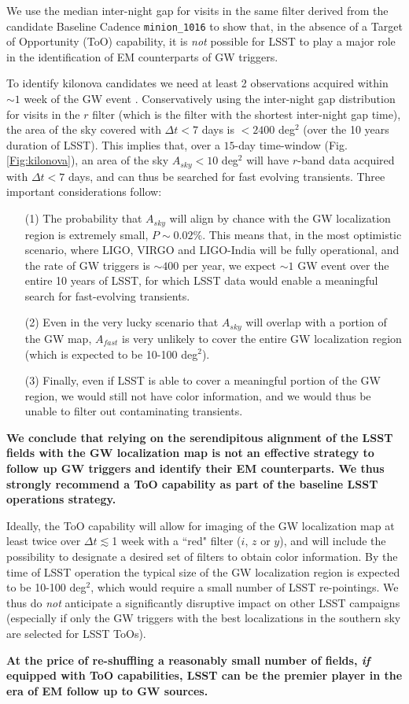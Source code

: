 We use the median inter-night gap  for visits in the same filter derived from the candidate Baseline Cadence \texttt{minion\_1016} to show that, in the absence of a Target of Opportunity (ToO) capability, it is \emph{not} possible for LSST  to play a major role in the identification of EM counterparts of GW triggers.  

To identify kilonova candidates we need at least 2 observations acquired within $\sim 1$ week  of the GW event \citep{Cowperthwaite15}.
Conservatively using the inter-night gap distribution for visits in the $r$ filter (which is the filter with the shortest  inter-night gap time), the area of the sky covered with  $\Delta t<7$ days is $<2400$ deg$^2$ (over the 10 years duration of LSST). This implies that, over a $15$-day time-window (Fig. \ref{Fig:kilonova}), an area of the sky $A_{sky}<10$ deg$^2$ will have $r$-band data acquired with $\Delta t<7$ days, and can thus be searched for fast evolving transients.  Three important considerations follow:
\begin{itemize}
\item[(1)] The probability that $A_{sky}$ will align by chance with the GW localization region is extremely small,  $P\sim0.02$\%. This means that,  in the most optimistic scenario, where LIGO, VIRGO and LIGO-India will be fully operational, and the rate of GW triggers is $\sim400$ per year, we expect $\sim1$ GW event over the entire 10 years of LSST, for which LSST data would enable a meaningful search for fast-evolving transients.
\item[(2)] Even in the very lucky scenario that $A_{sky}$ will overlap with a portion of  the GW map, $A_{fast}$ is very unlikely to cover the entire GW localization region (which is expected to be 10-100 deg$^2$).
\item[(3)]  Finally, even if LSST is able to cover a meaningful portion of the GW region, we would still not have color information, and we would thus be unable to filter out contaminating transients.
\end{itemize}

\textbf{We conclude that relying on the serendipitous alignment of the LSST fields with the GW localization map is not an effective strategy to follow up GW triggers and identify their EM counterparts. We thus strongly recommend a ToO capability as part of the baseline LSST operations strategy.}

Ideally, the ToO capability will allow for imaging of the GW localization map at least twice over $\Delta t\lesssim$1 week with a ``red" filter ($i$, $z$  or $y$),  and  will include the possibility to designate a desired set of filters to obtain color information. By the time of LSST operation the typical size of the GW localization region is expected to be 10-100 deg$^2$, which would require a small number of LSST re-pointings. We thus do \emph{not} anticipate a significantly disruptive impact on other LSST campaigns (especially if only the GW triggers with the best localizations in the southern sky are selected for LSST ToOs).

\textbf{At the price of re-shuffling a reasonably small number of fields, \emph{if} equipped with ToO capabilities, LSST can be the premier player in the era of EM follow up to GW sources.}







\navigationbar

